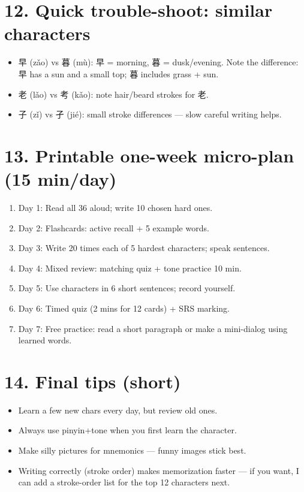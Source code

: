 \begin{CJK}{UTF8}{gbsn}
\section*{12. Quick trouble-shoot: similar characters}
\begin{itemize}
  \item 早 (zǎo) vs 暮 (mù): 早 = morning, 暮 = dusk/evening. Note the difference: 早 has a sun and a small top; 暮 includes grass + sun.
  \item 老 (lǎo) vs 考 (kǎo): note hair/beard strokes for 老.
  \item 子 (zǐ) vs 孑 (jié): small stroke differences — slow careful writing helps.
\end{itemize}

\section*{13. Printable one-week micro-plan (15 min/day)}
\begin{enumerate}
  \item Day 1: Read all 36 aloud; write 10 chosen hard ones.
  \item Day 2: Flashcards: active recall + 5 example words.
  \item Day 3: Write 20 times each of 5 hardest characters; speak sentences.
  \item Day 4: Mixed review: matching quiz + tone practice 10 min.
  \item Day 5: Use characters in 6 short sentences; record yourself.
  \item Day 6: Timed quiz (2 mins for 12 cards) + SRS marking.
  \item Day 7: Free practice: read a short paragraph or make a mini-dialog using learned words.
\end{enumerate}

\section*{14. Final tips (short)}
\begin{itemize}
  \item Learn a few new chars every day, but review old ones. \\
  \item Always use pinyin+tone when you first learn the character. \\
  \item Make silly pictures for mnemonics — funny images stick best. \\
  \item Writing correctly (stroke order) makes memorization faster — if you want, I can add a stroke-order list for the top 12 characters next.
\end{itemize}


\end{CJK}
